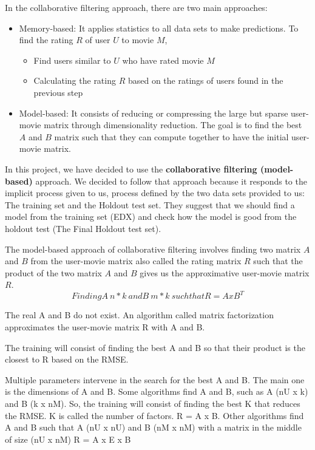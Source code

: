 \documentclass[
]{article}
\providecommand{\tightlist}{%
  \setlength{\itemsep}{0pt}\setlength{\parskip}{0pt}}
\begin{document}
In the collaborative filtering approach, there are two main approaches:

\begin{itemize}
\tightlist
\item
  Memory-based: It applies statistics to all data sets to make
  predictions. To find the rating \(R\) of user \(U\) to movie \(M\),

  \begin{itemize}
  \tightlist
  \item
    Find users similar to \(U\) who have rated movie \(M\)
  \item
    Calculating the rating \(R\) based on the ratings of users found in
    the previous step
  \end{itemize}
\item
  Model-based: It consists of reducing or compressing the large but
  sparse user-movie matrix through dimensionality reduction. The goal is
  to find the best \(A\) and \(B\) matrix such that they can compute
  together to have the initial user-movie matrix.
\end{itemize}

In this project, we have decided to use the \textbf{collaborative
filtering (model-based)} approach. We decided to follow that approach
because it responds to the implicit process given to us, process defined
by the two data sets provided to us: The training set and the Holdout
test set. They suggest that we should find a model from the training set
(EDX) and check how the model is good from the holdout test (The Final
Holdout test set).

The model-based approach of collaborative filtering involves finding two
matrix \(A\) and \(B\) from the user-movie matrix also called the rating
matrix \(R\) such that the product of the two matrix \(A\) and \(B\)
gives us the approximative user-movie matrix \(R\).
\[Finding A~n*k~ and B~m*k~ such that R = A x B^T\]

The real A and B do not exist. An algorithm called matrix factorization
approximates the user-movie matrix R with A and B.

The training will consist of finding the best A and B so that their
product is the closest to R based on the RMSE.

Multiple parameters intervene in the search for the best A and B. The
main one is the dimensions of A and B. Some algorithms find A and B,
such as A (nU x k) and B (k x nM). So, the training will consist of
finding the best K that reduces the RMSE. K is called the number of
factors. R = A x B. Other algorithms find A and B such that A (nU x nU)
and B (nM x nM) with a matrix in the middle of size (nU x nM) R = A x E
x B
\end{document}
